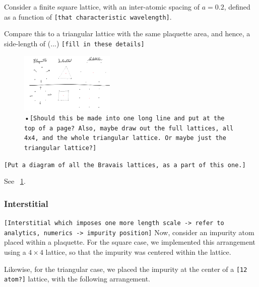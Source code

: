 \documentclass[aps,pra,superscriptaddress,twocolumn]{revtex4-1}
\newcommand{\fref}[1]{\text{Fig.}~\ref{#1}}
\newcommand{\commentSB}[1]{\texttt{\color{blue}[#1]}}
\newcommand{\commentSO}[1]{\texttt{\color{orange}[#1]}}
\newcommand{\commentTP}[1]{\texttt{\color{green}[#1]}}
\begin{document}
Consider a finite square lattice, with an inter-atomic spacing of $a = 0.2$, defined as a function of \commentSB{that characteristic wavelength}. 

Compare this to a triangular lattice with the same plaquette area, and hence, a side-length of (...) 
\commentSB{fill in these details}

\begin{figure}
    \centering
    \includegraphics[width=0.4\textwidth]{figures/triangle_and_square.png} 
    \caption{•\commentSB{Should this be made into one long line and put at the top of a page? Also, maybe draw out the full lattices, all 4x4, and the whole triangular lattice. Or maybe just the triangular lattice?}}
    \label{fig:triangle_and_square}
\end{figure}

\commentSB{Put a diagram of all the Bravais lattices, as a part of this one.}

See \fref{fig:triangle_and_square}.


\subsubsection{Interstitial}
\commentSO{Interstitial which imposes one more length scale -> refer to analytics, numerics -> impurity position}
Now, consider an impurity atom placed within a plaquette. For the square case, we implemented this arrangement using a $4\times 4$ lattice, so that the impurity was centered within the lattice. 


Likewise, for the triangular case, we placed the impurity at the center of a \commentSB{12 atom?} lattice, with the following arrangement. 

\end{document}
